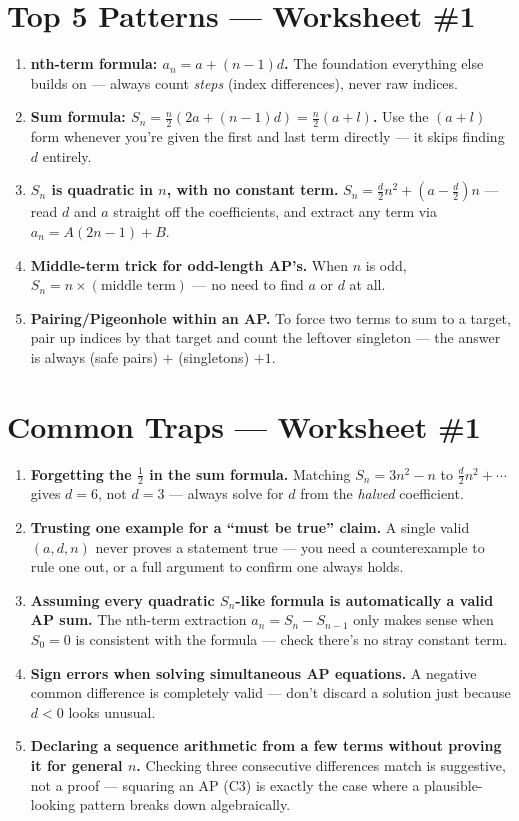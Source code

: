\documentclass[11pt,a4paper]{article}
\begin{document}
\section*{Top 5 Patterns --- Worksheet \#1}
\begin{enumerate}[leftmargin=2em,itemsep=4pt]
  \item \textbf{nth-term formula: $a_n=a+(n-1)d$.} The foundation everything else builds on --- always count \emph{steps} (index differences), never raw indices. 
  \item \textbf{Sum formula: $S_n=\frac n2(2a+(n-1)d)=\frac n2(a+l)$.} Use the $(a+l)$ form whenever you're given the first and last term directly --- it skips finding $d$ entirely. 
  \item \textbf{$S_n$ is quadratic in $n$, with no constant term.} $S_n=\frac d2n^2+(a-\frac d2)n$ --- read $d$ and $a$ straight off the coefficients, and extract any term via $a_n=A(2n-1)+B$. 
  \item \textbf{Middle-term trick for odd-length AP's.} When $n$ is odd, $S_n=n\times(\text{middle term})$ --- no need to find $a$ or $d$ at all. 
  \item \textbf{Pairing/Pigeonhole within an AP.} To force two terms to sum to a target, pair up indices by that target and count the leftover singleton --- the answer is always (safe pairs) $+$ (singletons) $+1$. 
\end{enumerate}

\section*{Common Traps --- Worksheet \#1}
\begin{enumerate}[leftmargin=2em,itemsep=4pt]
  \item \textbf{Forgetting the $\frac12$ in the sum formula.} Matching $S_n=3n^2-n$ to $\frac d2n^2+\cdots$ gives $d=6$, not $d=3$ --- always solve for $d$ from the \emph{halved} coefficient. 
  \item \textbf{Trusting one example for a ``must be true'' claim.} A single valid $(a,d,n)$ never proves a statement true --- you need a counterexample to rule one out, or a full argument to confirm one always holds. 
  \item \textbf{Assuming every quadratic $S_n$-like formula is automatically a valid AP sum.} The nth-term extraction $a_n=S_n-S_{n-1}$ only makes sense when $S_0=0$ is consistent with the formula --- check there's no stray constant term. 
  \item \textbf{Sign errors when solving simultaneous AP equations.} A negative common difference is completely valid --- don't discard a solution just because $d<0$ looks unusual. 
  \item \textbf{Declaring a sequence arithmetic from a few terms without proving it for general $n$.} Checking three consecutive differences match is suggestive, not a proof --- squaring an AP (C3) is exactly the case where a plausible-looking pattern breaks down algebraically. 
\end{enumerate}

\end{document}

